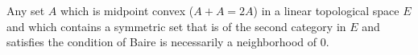 Any set $A$ which is midpoint convex ($A + A = 2A$) in a linear topological space $E$ and which contains a symmetric set that is of the second category in $E$ and satisfies the condition of Baire is necessarily a neighborhood of $0$.
